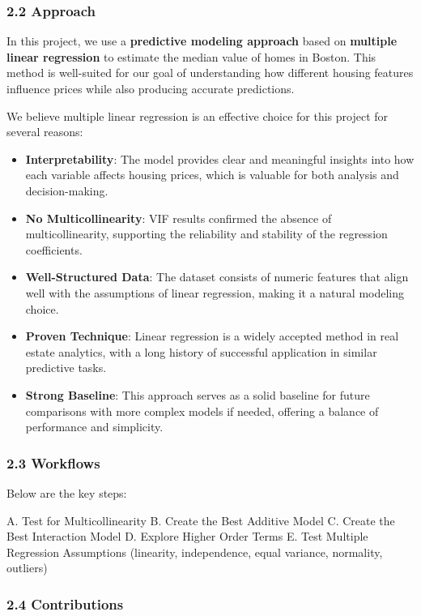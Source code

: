 \documentclass[
]{article}
\begin{document}
\subsubsection{2.2 Approach}\label{approach}

In this project, we use a \textbf{predictive modeling approach} based on
\textbf{multiple linear regression} to estimate the median value of
homes in Boston. This method is well-suited for our goal of
understanding how different housing features influence prices while also
producing accurate predictions.

We believe multiple linear regression is an effective choice for this
project for several reasons:

\begin{itemize}
\item
  \textbf{Interpretability}: The model provides clear and meaningful
  insights into how each variable affects housing prices, which is
  valuable for both analysis and decision-making.
\item
  \textbf{No Multicollinearity}: VIF results confirmed the absence of
  multicollinearity, supporting the reliability and stability of the
  regression coefficients.
\item
  \textbf{Well-Structured Data}: The dataset consists of numeric
  features that align well with the assumptions of linear regression,
  making it a natural modeling choice.
\item
  \textbf{Proven Technique}: Linear regression is a widely accepted
  method in real estate analytics, with a long history of successful
  application in similar predictive tasks.
\item
  \textbf{Strong Baseline}: This approach serves as a solid baseline for
  future comparisons with more complex models if needed, offering a
  balance of performance and simplicity.
\end{itemize}

\subsubsection{2.3 Workflows}\label{workflows}

Below are the key steps:

A. Test for Multicollinearity B. Create the Best Additive Model C.
Create the Best Interaction Model D. Explore Higher Order Terms E. Test
Multiple Regression Assumptions (linearity, independence, equal
variance, normality, outliers)

\subsubsection{2.4 Contributions}\label{contributions}
\end{document}
